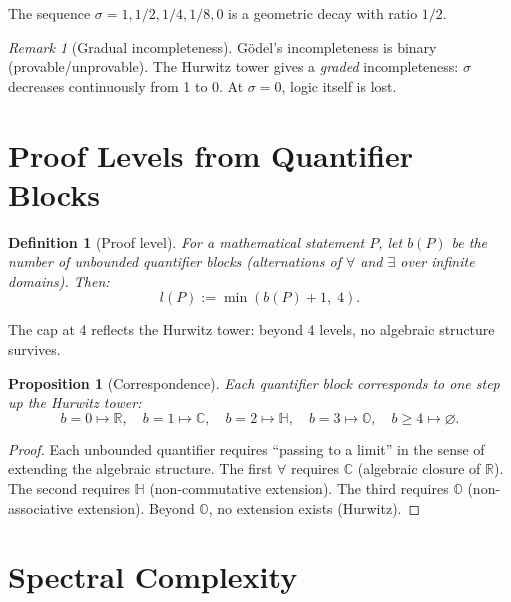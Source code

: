 \documentclass[12pt]{article}
\newtheorem{proposition}[theorem]{Proposition}
\newtheorem{definition}[theorem]{Definition}
\theoremstyle{remark}
\newtheorem{remark}[theorem]{Remark}
\newcommand{\CC}{\mathbb{C}}
\newcommand{\RR}{\mathbb{R}}
\newcommand{\HH}{\mathbb{H}}
\newcommand{\OO}{\mathbb{O}}
\begin{document}
The sequence $\sigma = 1, 1/2, 1/4, 1/8, 0$ is a
geometric decay with ratio $1/2$.

\begin{remark}[Gradual incompleteness]
G\"odel's incompleteness is binary (provable/unprovable).
The Hurwitz tower gives a \emph{graded} incompleteness:
$\sigma$ decreases continuously from 1 to 0.
At $\sigma = 0$, logic itself is lost.
\end{remark}

\section{Proof Levels from Quantifier Blocks}

\begin{definition}[Proof level]
For a mathematical statement $P$, let $b(P)$ be the number
of unbounded quantifier blocks (alternations of $\forall$
and $\exists$ over infinite domains). Then:
\[
  l(P) := \min(b(P) + 1,\; 4).
\]
\end{definition}

The cap at 4 reflects the Hurwitz tower: beyond 4 levels,
no algebraic structure survives.

\begin{proposition}[Correspondence]
Each quantifier block corresponds to one step up the
Hurwitz tower:
\[
  b = 0 \mapsto \RR, \quad
  b = 1 \mapsto \CC, \quad
  b = 2 \mapsto \HH, \quad
  b = 3 \mapsto \OO, \quad
  b \ge 4 \mapsto \varnothing.
\]
\end{proposition}

\begin{proof}
Each unbounded quantifier requires ``passing to a limit''
in the sense of extending the algebraic structure.
The first $\forall$ requires $\CC$ (algebraic closure of $\RR$).
The second requires $\HH$ (non-commutative extension).
The third requires $\OO$ (non-associative extension).
Beyond $\OO$, no extension exists (Hurwitz).
\end{proof}

\section{Spectral Complexity}
\end{document}
